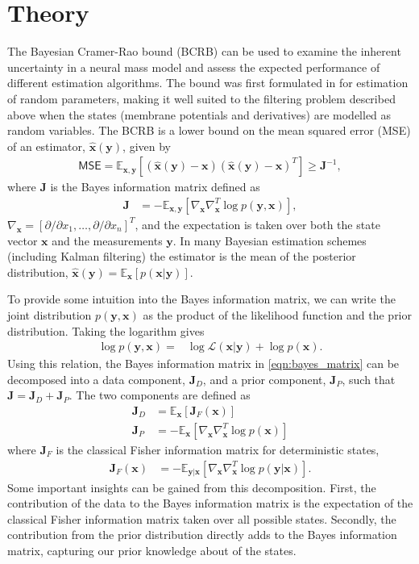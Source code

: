 \documentclass{article}
\renewcommand{\vec}[1]{\ensuremath{{\boldsymbol #1}}}
\newcommand{\mat}[1]{\ensuremath{\boldsymbol{#1}}}
\begin{document}
\section{Theory}
The Bayesian Cramer-Rao bound (BCRB) can be used to examine the inherent uncertainty in a neural mass model and assess the expected performance of different estimation algorithms. The bound was first formulated in \cite{VanTrees1968} for estimation of random parameters, making it well suited to the filtering problem described above when the states (membrane potentials and derivatives) are modelled as random variables. The BCRB is a lower bound on the mean squared error (MSE) of an estimator, $\hat{\vec x}(\vec y)$, given by
\begin{align}
	\mathsf{MSE} = \mathbb E_{\vec x,\vec y} [(\hat{\vec x}(\vec y) - \vec x)(\hat{\vec x}(\vec y) - \vec x)^T] \ge \mat J^{-1},
	\label{eqn:mse_bound}
\end{align}
where $\mat J$ is the Bayes information matrix defined as
\begin{align}
	\mat J &= -\mathbb E_{\vec x,\vec y}\left[ \nabla_{\vec x}\nabla_{\vec x}^T \log p(\vec y,\vec x) \right],
	\label{eqn:bayes_matrix}
\end{align}
$\nabla_{\vec x} = [\partial/\partial x_1,\ldots,\partial/\partial x_n]^T$, and the expectation is taken over both the state vector $\vec x$ and the measurements $\vec y$. In many Bayesian estimation schemes (including Kalman filtering) the estimator is the mean of the posterior distribution, $\hat{\vec x}(\vec y) = \mathbb{E}_{\vec x}\left[ p (\vec x|\vec y)\right]$. 

To provide some intuition into the Bayes information matrix, we can write the joint distribution $p(\vec y,\vec x)$ as the product of the likelihood function and the prior distribution. Taking the logarithm gives
\begin{align}
	\log p(\vec y,\vec x) =& \log\mathcal{L}(\vec x|\vec y) + \log p(\vec x).
\end{align}
Using this relation, the Bayes information matrix in \eqref{eqn:bayes_matrix} can be decomposed into a data component, $\mat J_D$, and a prior component, $\mat J_P$, such that $\mat J = \mat J_D + \mat J_P$.
The two components are defined as
\begin{align}
	\mat J_D &= \mathbb E_{\vec x}\left[ \mat J_F(\vec x) \right]  \\
	\mat J_P &= -\mathbb E_{\vec x}\left[ \nabla_{\vec x}\nabla_{\vec x}^T \log p(\vec x) \right]
\end{align}
where $\mat J_F$ is the classical Fisher information matrix for deterministic states,
\begin{align}
	\mat J_F(\vec x) &= -\mathbb E_{\vec y| \vec x}\left[ \nabla_{\vec x}\nabla_{\vec x}^T \log p(\vec y|\vec x) \right].
\end{align}
Some important insights can be gained from this decomposition. First, the contribution of the data to the Bayes information matrix is the expectation of the classical Fisher information matrix taken over all possible states. Secondly, the contribution from the prior distribution directly adds to the Bayes information matrix, capturing our prior knowledge about of the states.
\end{document}
